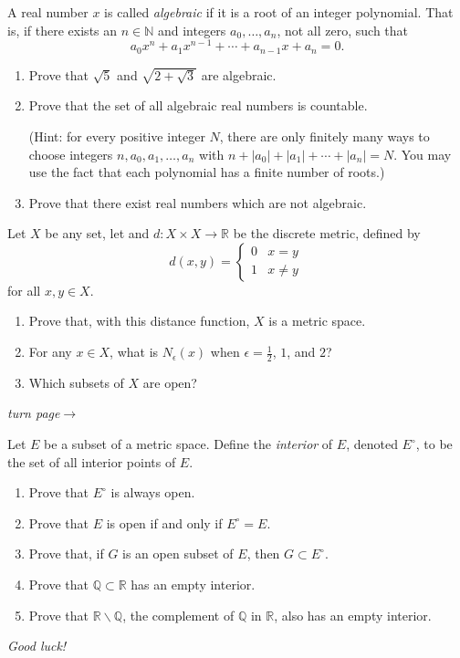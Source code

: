 \documentclass[10pt]{article}
\newcommand{\N}{\mathbb{N}}
\newcommand{\R}{\mathbb{R}}
\newcommand{\Q}{\mathbb{Q}}
\newcommand{\abs}[1]{\left| #1 \right|}
\newenvironment{problem}[2][Problem]{\begin{trivlist}
\item[\hskip \labelsep {\bfseries #1}\hskip \labelsep {\bfseries #2.}]}{\end{trivlist}}
\begin{document}
\begin{problem}{2} 
A real number $x$ is called \emph{algebraic} if it is a root of an integer polynomial. That is, if there exists an $n \in \N$ and integers $a_0, \dots, a_n$, not all zero, such that
\begin{equation*}
a_0 x^n + a_1 x^{n-1} + \cdots + a_{n-1} x + a_n = 0.
\end{equation*}

\begin{enumerate}
	\item
	Prove that $\sqrt{5}$ and $\sqrt{2 + \sqrt{3}}$ are algebraic.
	
	\item 
	Prove that the set of all algebraic real numbers is countable.  
	
	\noindent (Hint: for every positive integer $N$, there are
	only finitely many ways to choose integers $n, a_0, a_1, \dots, a_n$ with $n + \abs{a_0} + \abs{a_1} + \cdots + \abs{a_n} = N$.  You may use the fact that each polynomial has a finite number of roots.)
	
	\item Prove that there exist real numbers which are not algebraic.
\end{enumerate}
\end{problem}
\medskip

\begin{problem}{3}
	Let $X$ be any set, let and $d:X\times X\to \R$ be the discrete metric, defined by
	\[
	d(x,y)=\begin{cases}0&x=y \, \\ 1&x\neq y\end{cases}
	\]
	for all $x,y\in X$.
	\begin{enumerate}
		\item Prove that, with this distance function, $X$ is a metric space.
		\item For any $x\in X$, what is $N_\epsilon(x)$ when $\epsilon = \frac{1}{2}$, $1$, and $2$?
		\item Which subsets of $X$ are open?
	\end{enumerate}
\end{problem}

\vfill\hfill \emph{turn page}$ \longrightarrow $
\newpage

\begin{problem}{4}
	Let $E$ be a subset of a metric space. Define the \emph{interior} of $E$, denoted $E^\circ$, to be the set of all interior points of $E$.
	\begin{enumerate}
		\item Prove that $E^\circ$ is always open.
		\item Prove that $E$ is open if and only if $E^\circ = E$.
		\item Prove that, if $G$ is an open subset of $E$, then $G \subset E^\circ$.
		\item Prove that $ \Q \subset \R $ has an empty interior.
		\item Prove that $ \R \smallsetminus \Q $, the complement of $ \Q $ in $ \R $, also has an empty interior.
	\end{enumerate}
\end{problem}


\vspace{3cm}\hfill \emph{Good luck!}
\end{document}
